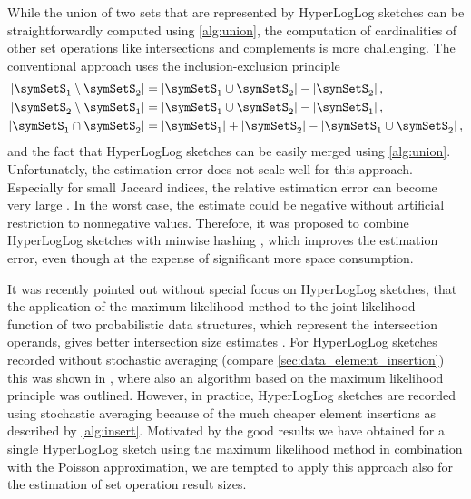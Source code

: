 \documentclass[a4paper]{scrartcl}
\begin{document}
While the union of two sets that are represented by HyperLogLog sketches can be straightforwardly computed using \cref{alg:union}, the computation of cardinalities of other set operations like intersections and complements is more challenging. The conventional approach uses the inclusion-exclusion principle 
\begin{equation}
\label{equ:conventional_approach}
\begin{aligned}
\left\vert\symSetS_1 \setminus \symSetS_2\right\vert
&=
\left\vert\symSetS_1 \cup \symSetS_2\right\vert
-
\left\vert\symSetS_2\right\vert,
\\
\left\vert\symSetS_2 \setminus \symSetS_1\right\vert
&=
\left\vert\symSetS_1 \cup \symSetS_2\right\vert
-
\left\vert\symSetS_1\right\vert,
\\
\left\vert\symSetS_1 \cap \symSetS_2\right\vert
&=  
\left\vert\symSetS_1\right\vert  
+
\left\vert\symSetS_2\right\vert
-
\left\vert\symSetS_1 \cup \symSetS_2\right\vert,
\end{aligned}
\end{equation}
and the fact that HyperLogLog sketches can be easily merged using \cref{alg:union}. Unfortunately, the estimation error does not scale well for this approach. Especially for small Jaccard indices, the relative estimation error can become very large \cite{Dasgupta2015}. In the worst case, the estimate could be negative without artificial restriction to nonnegative values. Therefore, it was proposed to combine HyperLogLog sketches with minwise hashing \cite{Pascoe2013, Cohen2016}, which improves the estimation error, even though at the expense of significant more space consumption. 

It was recently pointed out without special focus on HyperLogLog sketches, that the application of the maximum likelihood method to the joint likelihood function of two probabilistic data structures, which represent the intersection operands, gives better intersection size estimates \cite{Ting2016}. For HyperLogLog sketches recorded without stochastic averaging (compare \cref{sec:data_element_insertion}) this was shown in \cite{Cohen2016}, where also an algorithm based on the maximum likelihood principle was outlined. However, in practice, HyperLogLog sketches are recorded using stochastic averaging because of the much cheaper element insertions as described by \cref{alg:insert}. Motivated by the good results we have obtained for a single HyperLogLog sketch using the maximum likelihood method in combination with the Poisson approximation, we are tempted to apply this approach also for the estimation of set operation result sizes.
\end{document}

